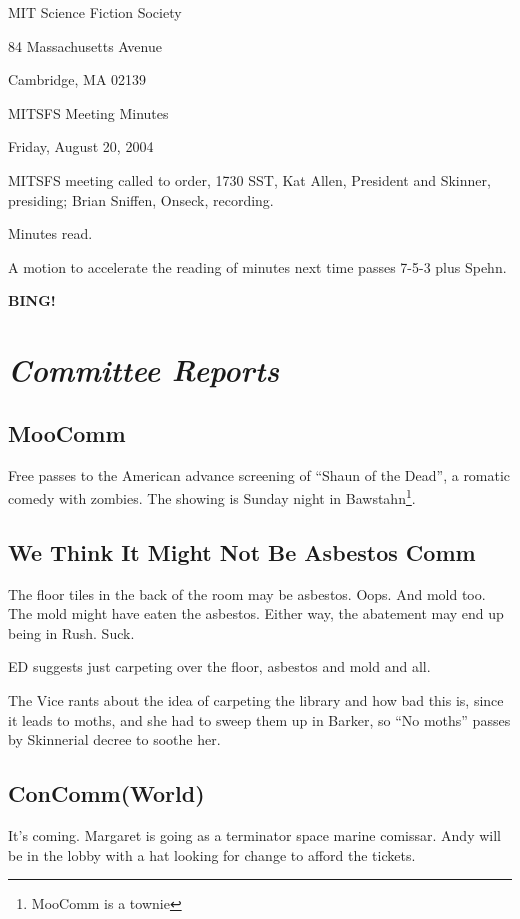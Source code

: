\documentclass[10pt]{article}
\newcommand{\bing}{{\bf BING!} }
\newcommand{\goto}[1]{\bing \vskip 12pt \section*{{\em{#1}}}}
\newcommand{\ps}{ plus Spehn\xspace}
\begin{document}
\begin{center}

MIT Science Fiction Society 

84 Massachusetts Avenue

Cambridge, MA 02139

\vspace{12pt}

MITSFS Meeting Minutes 

Friday, August 20, 2004

\end{center}
 
\vspace{18pt}

\setlength{\parskip}{6pt}

\noindent
MITSFS meeting called to order, 1730 SST, Kat Allen, President and
Skinner, presiding; Brian Sniffen,  Onseck, recording.

Minutes read.

A motion to accelerate the reading of minutes next time passes 7-5-3\ps.

\goto{Committee Reports}

\subsection*{MooComm}
Free passes to the American advance screening of ``Shaun of the
Dead'', a romatic comedy with zombies.  The showing is Sunday night in
Bawstahn\footnote{MooComm is a townie}.

\subsection*{We Think It Might Not Be Asbestos Comm}
The floor tiles in the back of the room may be asbestos.  Oops.  And
mold too.  The mold might have eaten the asbestos.  Either way, the
abatement may end up being in Rush.  Suck.

ED suggests just carpeting over the floor, asbestos and mold and all.

The Vice rants about the idea of carpeting the library and how bad
this is, since it leads to moths, and she had to sweep them up in
Barker, so ``No moths'' passes by Skinnerial decree to soothe her.

\subsection*{ConComm(World)}
It's coming.  Margaret is going as a terminator space marine comissar.
Andy will be in the lobby with a hat looking for change to afford the
tickets.
\end{document}
